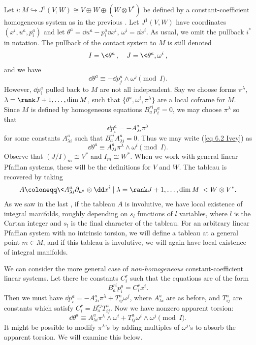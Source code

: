\begin{example}\label{ex linear pfaff}
    Let $i:M\hookrightarrow J^1(V,W)\cong V\oplus W\oplus (W\otimes V^\ast)$ be defined by a constant-coefficient homogeneous system as in the previous \subsect. Let $J^1(V,W)$ have coordinates $(x^i,u^a,p^a_i)$ and let $\theta^a=\dd u^a-p^a_i \dd x^i$, $\omega^i=\dd x^i$. As usual, we omit the pullback $i^\ast$ in notation. The pullback of the contact system to $M$ is still denoted 
    \[I=\<\theta^a\>,\quad J=\<\theta^a,\omega^i\>,\]
    and we have 
    \[\dd\theta^a\equiv -\dd p^a_j\wedge \omega^j\pmod{I}.\label{eq 6.2 Ivey}\]
    However, $\dd p^a_i$ pulled back to $M$ are not all independent. Say we choose forms $\pi^\lambda$, $\lambda=\rank J+1,\ldots,\dim M$, such that $\{\theta^a,\omega^i,\pi^\lambda\}$ are a local coframe for $M$. Since $M$ is defined by homogeneous equations $B^{ri}_a p^a_i=0$, we may choose  $\pi^\lambda$ so that 
    \[\dd p^a_i=-A^a_{\lambda i}\pi^\lambda\]
    for some constants $A^a_{\lambda i}$ such that $B^{ri}_a A^a_{\lambda i}=0$. Thus we may write (\ref{eq 6.2 Ivey}) as 
    \[\dd\theta^a\equiv A^a_{\lambda i}\pi^\lambda\wedge\omega^i \pmod{I}.\]
    Observe that $(J\slash I)_m\cong V^\ast$  and $I_m\cong W^\ast$. When we work with general linear Pfaffian systems, these will be the definitions for $V$ and $W$. The tableau is recovered by taking 
    \[A\coloneqq \<A^a_{\lambda i}\partial_{u^a}\otimes \dd x^i\mid \lambda=\rank J+1,\ldots,\dim M\>< W\otimes V^\ast.\]
    As we saw in the last \subsect, if the tableau $A$ is involutive, we have local existence of integral manifolds, roughly depending on $s_l$ functions of $l$ variables, where $l$ is the Cartan integer and $s_l$ is the final character of the tableau. For an arbitrary linear Pfaffian system with no intrinsic torsion, we will define a tableau at a general point $m\in M$, and if this tableau is involutive, we will again have local existence of integral manifolds.
\end{example}


\begin{rem}\label{rem 6.3.1 Ivey}
    We can consider the more general case of \emph{non-homogeneous} constant-coefficient linear systems. Let there be constants $C^r_i$ such that the equations are of the form 
    \[B^{ri}_a p^a_i=C^r_i x^i.\]
    Then we must have $\dd p^a_i=-A^a_{\lambda i}\pi^\lambda+T^a_{ij}\omega^j$, where $A^a_{\lambda i}$ are as before, and $T^a_{ij}$ are constants which satisfy $C^r_i=B_a^{rj}T^a_{ij}$. Now we have nonzero apparent torsion:
    \[\dd\theta^a\equiv A^a_{\lambda i}\pi^\lambda \wedge \omega^i+T^a_{ij}\omega^i\wedge\omega^j\pmod{I}.\]
    It might be possible to modify $\pi^\lambda$'s by adding multiples of $\omega^j$'s to absorb the apparent torsion. We will examine this below.
\end{rem}

